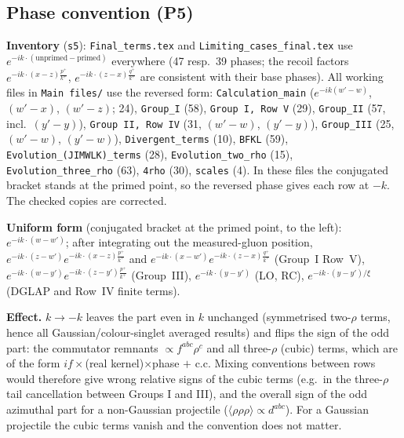 \subsection{Phase convention (P5)}\label{sec:pd-phase}
\noindent\textbf{Inventory} (\texttt{s5}): \texttt{Final\_terms.tex} and \texttt{Limiting\_cases\_final.tex} use $e^{-ik\cdot(\text{unprimed}-\text{primed})}$ everywhere (47 resp.\ 39 phases; the recoil factors $e^{-ik\cdot(x-z)\frac{p^{+}}{k^{+}}}$, $e^{-ik\cdot(z-x)\frac{q^{+}}{k^{+}}}$ are consistent with their base phases). All working files in \texttt{Main files/} use the reversed form: \texttt{Calculation\_main} ($e^{-ik(w'-w)}$, $(w'-x)$, $(w'-z)$; 24), \texttt{Group\_I} (58), \texttt{Group I, Row V} (29), \texttt{Group\_II} (57, incl.\ $(y'-y)$), \texttt{Group II, Row IV} (31, $(w'-w)$, $(y'-y)$), \texttt{Group\_III} (25, $(w'-w)$, $(y'-w)$), \texttt{Divergent\_terms} (10), \texttt{BFKL} (59), \texttt{Evolution\_(JIMWLK)\_terms} (28), \texttt{Evolution\_two\_rho} (15), \texttt{Evolution\_three\_rho} (63), \texttt{4rho} (30), \texttt{scales} (4). In these files the conjugated bracket stands at the primed point, so the reversed phase gives each row at $-k$. The checked copies are corrected.

\noindent\textbf{Uniform form} (conjugated bracket at the primed point, to the left): $e^{-ik\cdot(w-w')}$; after integrating out the measured-gluon position, $e^{-ik\cdot(z-w')}e^{-ik\cdot(x-z)\frac{p^{+}}{k^{+}}}$ and $e^{-ik\cdot(x-w')}e^{-ik\cdot(z-x)\frac{q^{+}}{k^{+}}}$ (Group~I Row~V), $e^{-ik\cdot(w-y')}e^{-ik\cdot(z-y')\frac{p^{+}}{k^{+}}}$ (Group~III), $e^{-ik\cdot(y-y')}$ (LO, RC), $e^{-ik\cdot(y-y')/\xi}$ (DGLAP and Row~IV finite terms).

\noindent\textbf{Effect.} $k\to-k$ leaves the part even in $k$ unchanged (symmetrised two-$\rho$ terms, hence all Gaussian/colour-singlet averaged results) and flips the sign of the odd part: the commutator remnants $\propto f^{abc}\rho^{c}$ and all three-$\rho$ (cubic) terms, which are of the form $i f\times$(real kernel)$\times$phase $+$ c.c. Mixing conventions between rows would therefore give wrong relative signs of the cubic terms (e.g.\ in the three-$\rho$ tail cancellation between Groups I and III), and the overall sign of the odd azimuthal part for a non-Gaussian projectile ($\langle\rho\rho\rho\rangle\propto d^{abc}$). For a Gaussian projectile the cubic terms vanish and the convention does not matter.

